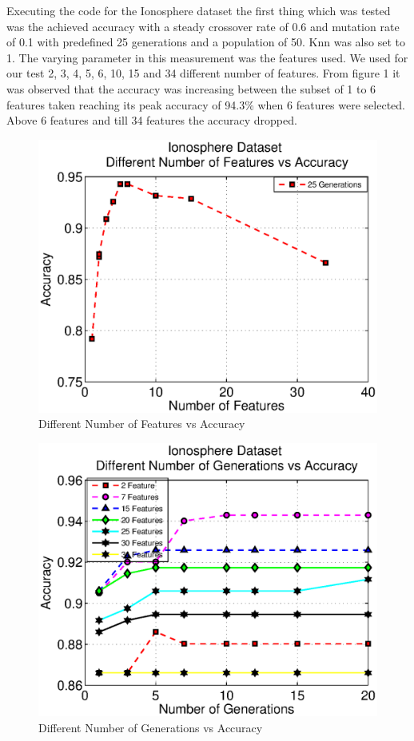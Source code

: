 \documentclass[11pt,onecolumn,a4paper]{article}
\begin{document}
Executing the code for the Ionosphere dataset the first thing which was tested was the achieved accuracy with a steady crossover rate of 0.6 and mutation rate of 0.1 with predefined 25 generations and a population of 50. Knn was also set to 1. The varying parameter in this measurement was the features used. We used for our test 2, 3, 4, 5, 6, 10, 15 and 34 different number of features. From figure 1 it was observed that the accuracy was increasing between the subset of 1 to 6 features taken reaching its peak accuracy of 94.3\% when 6 features were selected. Above 6 features and till 34 features the accuracy dropped.    
    \begin{figure}[h!]
      \centering
      \includegraphics[width=0.6\linewidth]{img/ionfeat2.eps}
     \caption{Different Number of Features vs Accuracy}
    \end{figure}
    \begin{figure}[h!]
      \centering
      \includegraphics[width=0.6\linewidth]{img/ionfeat.eps}
      \caption{Different Number of Generations vs Accuracy}
    \end{figure}
\end{document}
